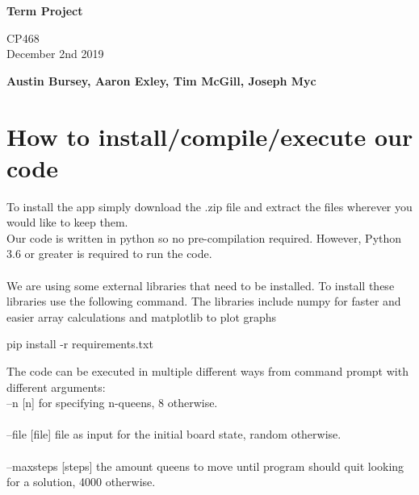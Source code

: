 \documentclass{article}
\begin{document}
\begin{titlepage}
  \pagestyle{fancy}
  \thispagestyle{fancy}
   \begin{center}
       \vspace*{1cm}
 
      \Huge
       \textbf{Term Project}
 
       \vspace{0.5cm}
       \Large
        CP468 \\ December 2nd 2019
 
       \vspace{1.5cm}
 
       \textbf{Austin Bursey, Aaron Exley, Tim McGill, Joseph Myc}
 
       \vfill

       \vspace{0.8cm}
 
   \end{center}
\end{titlepage}
\setcounter{page}{2}

\section{How to install/compile/execute our code}
To install the app simply download the .zip file and extract the files wherever you would like to keep them.
\\
Our code is written in python so no pre-compilation required. However, Python 3.6 or greater is required to run the code. \\
\\
We are using some external libraries that need to be installed.  To install these libraries use the following command. The libraries include numpy for faster and easier array calculations and matplotlib to plot graphs\\
\begin{center}
pip install -r requirements.txt
\end{center}
The code can be executed in multiple different ways from command prompt with different arguments:\\

--n [n] for specifying n-queens, 8 otherwise.\\
\\
--file [file] file as input for the initial board state, random otherwise.\\
\\
--maxsteps [steps] the amount queens to move until program should quit looking for a solution, 4000 otherwise. \\
\end{document}
